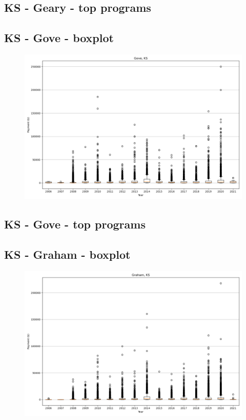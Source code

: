 \subsection*{KS - Geary - top programs}

\newpage
\subsection*{KS - Gove - boxplot}
\begin{figure}[h]
\centering
\includegraphics[width=7in]{../output/boxplots/counties/Gove-KS_boxplot.png}
\end{figure}


\subsection*{KS - Gove - top programs}

\newpage
\subsection*{KS - Graham - boxplot}
\begin{figure}[h]
\centering
\includegraphics[width=7in]{../output/boxplots/counties/Graham-KS_boxplot.png}
\end{figure}


